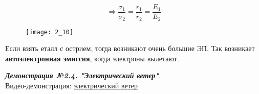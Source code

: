 \begin{equation}
\Rightarrow \frac{\sigma_{1}}{\sigma_{2}} = \frac{r_{1}}{r_{2}} = \frac{E_{1}}{E_{2}}
\end{equation}

\begin{figure}[!ht]
\centering
 \texttt{[image: 2\_10]}     
 \label{fig:my_label}
 \caption{}
\end{figure}


Если взять еталл с острием, тогда возникают очень большие ЭП. Так возникает \textbf{автоэлектронная эмиссия}, когда электроны вылетают. 

\large
\textbf{\textit{Демонстрация №2.4. "Электрический ветер"}}.\\
\normalsize
Видео-демонстрация: \href{https://mipt.lectoriy.ru/lecture/Physics-Coursera-Electricity1-W4D6}{электрический ветер}


